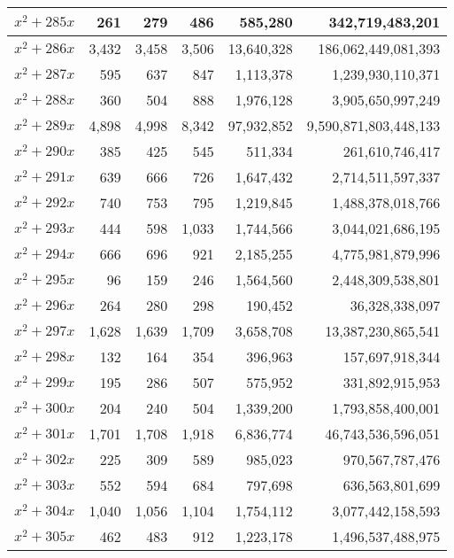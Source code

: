 \documentclass{article}
\begin{document}
\begin{center}
\begin{tabular}{ | c | r | r | r | r | r | }
$x^2 + 285x$ & 261 & 279 & 486 & 585{,}280 & 342{,}719{,}483{,}201 \\ \hline
$x^2 + 286x$ & 3{,}432 & 3{,}458 & 3{,}506 & 13{,}640{,}328 & 186{,}062{,}449{,}081{,}393 \\ \hline
$x^2 + 287x$ & 595 & 637 & 847 & 1{,}113{,}378 & 1{,}239{,}930{,}110{,}371 \\ \hline
$x^2 + 288x$ & 360 & 504 & 888 & 1{,}976{,}128 & 3{,}905{,}650{,}997{,}249 \\ \hline
$x^2 + 289x$ & 4{,}898 & 4{,}998 & 8{,}342 & 97{,}932{,}852 & 9{,}590{,}871{,}803{,}448{,}133 \\ \hline
$x^2 + 290x$ & 385 & 425 & 545 & 511{,}334 & 261{,}610{,}746{,}417 \\ \hline
$x^2 + 291x$ & 639 & 666 & 726 & 1{,}647{,}432 & 2{,}714{,}511{,}597{,}337 \\ \hline
$x^2 + 292x$ & 740 & 753 & 795 & 1{,}219{,}845 & 1{,}488{,}378{,}018{,}766 \\ \hline
$x^2 + 293x$ & 444 & 598 & 1{,}033 & 1{,}744{,}566 & 3{,}044{,}021{,}686{,}195 \\ \hline
$x^2 + 294x$ & 666 & 696 & 921 & 2{,}185{,}255 & 4{,}775{,}981{,}879{,}996 \\ \hline
$x^2 + 295x$ & 96 & 159 & 246 & 1{,}564{,}560 & 2{,}448{,}309{,}538{,}801 \\ \hline
$x^2 + 296x$ & 264 & 280 & 298 & 190{,}452 & 36{,}328{,}338{,}097 \\ \hline
$x^2 + 297x$ & 1{,}628 & 1{,}639 & 1{,}709 & 3{,}658{,}708 & 13{,}387{,}230{,}865{,}541 \\ \hline
$x^2 + 298x$ & 132 & 164 & 354 & 396{,}963 & 157{,}697{,}918{,}344 \\ \hline
$x^2 + 299x$ & 195 & 286 & 507 & 575{,}952 & 331{,}892{,}915{,}953 \\ \hline
$x^2 + 300x$ & 204 & 240 & 504 & 1{,}339{,}200 & 1{,}793{,}858{,}400{,}001 \\ \hline
$x^2 + 301x$ & 1{,}701 & 1{,}708 & 1{,}918 & 6{,}836{,}774 & 46{,}743{,}536{,}596{,}051 \\ \hline
$x^2 + 302x$ & 225 & 309 & 589 & 985{,}023 & 970{,}567{,}787{,}476 \\ \hline
$x^2 + 303x$ & 552 & 594 & 684 & 797{,}698 & 636{,}563{,}801{,}699 \\ \hline
$x^2 + 304x$ & 1{,}040 & 1{,}056 & 1{,}104 & 1{,}754{,}112 & 3{,}077{,}442{,}158{,}593 \\ \hline
$x^2 + 305x$ & 462 & 483 & 912 & 1{,}223{,}178 & 1{,}496{,}537{,}488{,}975 \\ \hline

\end{tabular}
\end{center}
\end{document}
